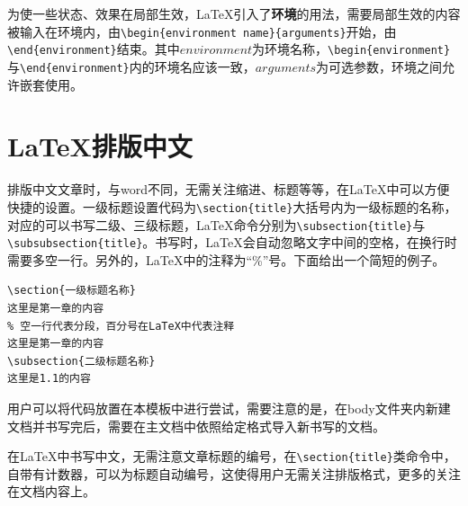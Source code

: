 为使一些状态、效果在局部生效，\LaTeX 引入了\textbf{环境}的用法，需要局部生效的内容被输入在环境内，由\verb|\begin{environment name}{arguments}|开始，由\verb|\end{environment}|结束。其中$environment$为环境名称，\verb|\begin{environment}|与\verb|\end{environment}|内的环境名应该一致，$arguments$为可选参数，环境之间允许嵌套使用。
\section{\LaTeX 排版中文}
排版中文文章时，与word不同，无需关注缩进、标题等等，在\LaTeX 中可以方便快捷的设置。一级标题设置代码为\verb|\section{title}|大括号内为一级标题的名称，对应的可以书写二级、三级标题，\LaTeX 命令分别为\verb|\subsection{title}|与\verb|\subsubsection{title}|。书写时，\LaTeX 会自动忽略文字中间的空格，在换行时需要多空一行。另外的，\LaTeX 中的注释为“\%”号。下面给出一个简短的例子。
\begin{verbatim}
\section{一级标题名称}
这里是第一章的内容
% 空一行代表分段，百分号在LaTeX中代表注释
这里是第一章的内容
\subsection{二级标题名称}
这里是1.1的内容
\end{verbatim}

用户可以将代码放置在本模板中进行尝试，需要注意的是，在body文件夹内新建文档并书写完后，需要在主文档中依照给定格式导入新书写的文档。

在\LaTeX 中书写中文，无需注意文章标题的编号，在\verb|\section{title}|类命令中，自带有计数器，可以为标题自动编号，这使得用户无需关注排版格式，更多的关注在文档内容上。
